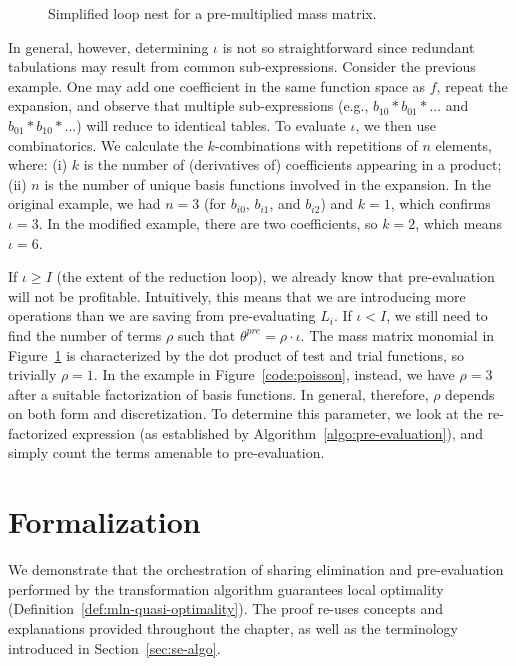 \begin{figure}[h]\begin{CenteredBox}

\end{CenteredBox}\caption{Simplified loop nest for a pre-multiplied mass matrix.}\label{code:increase_factor}\end{figure}

In general, however, determining $\iota$ is not so straightforward since redundant tabulations may result from common sub-expressions. Consider the previous example. One may add one coefficient in the same function space as $f$, repeat the expansion, and observe that multiple sub-expressions (e.g., $b_{10}*b_{01}*...$ and $b_{01}*b_{10}*...$) will reduce to identical tables. To evaluate $\iota$, we then use combinatorics. We calculate the $k$-combinations with repetitions of $n$ elements, where: (i) $k$ is the number of (derivatives of) coefficients appearing in a product; (ii) $n$ is the number of unique basis functions involved in the expansion. In the original example, we had $n=3$ (for $b_{i0}$, $b_{i1}$, and $b_{i2}$) and $k=1$, which confirms $\iota=3$. In the modified example, there are two coefficients, so $k=2$, which means $\iota=6$.

If $\iota \geq I$ (the extent of the reduction loop), we already know that pre-evaluation will not be profitable. Intuitively, this means that we are introducing more operations than we are saving from pre-evaluating $L_i$. If $\iota < I$, we still need to find the number of terms $\rho$ such that $\theta^{pre} = \rho \cdot \iota$. The mass matrix monomial in Figure~\ref{code:increase_factor} is characterized by the dot product of test and trial functions, so trivially $\rho = 1$. In the example in Figure~\ref{code:poisson}, instead, we have $\rho = 3$ after a suitable factorization of basis functions. In general, therefore, $\rho$ depends on both form and discretization. To determine this parameter, we look at the re-factorized expression (as established by Algorithm~\ref{algo:pre-evaluation}), and simply count the terms amenable to pre-evaluation.

\section{Formalization}
\label{sec:proof}
We demonstrate that the orchestration of sharing elimination and pre-evaluation performed by the transformation algorithm guarantees local optimality (Definition~\ref{def:mln-quasi-optimality}). The proof re-uses concepts and explanations provided throughout the chapter, as well as the terminology introduced in Section~\ref{sec:se-algo}.

